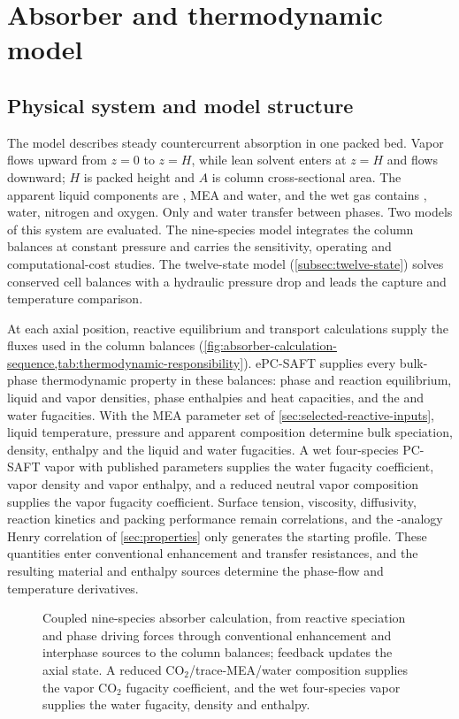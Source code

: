 \section{Absorber and thermodynamic model}\label{sec:model-framework}
\subsection{Physical system and model structure}
The model describes steady countercurrent absorption in one packed bed.
Vapor flows upward from $z=0$ to $z=H$, while lean solvent enters at $z=H$ and flows downward; $H$ is packed height and $A$ is column cross-sectional area.
The apparent liquid components are \COtwo, MEA and water, and the wet gas contains \COtwo, water, nitrogen and oxygen.
Only \COtwo{} and water transfer between phases.
Two models of this system are evaluated.
The nine-species model integrates the column balances at constant pressure and carries the sensitivity, operating and computational-cost studies.
The twelve-state model (\cref{subsec:twelve-state}) solves conserved cell balances with a hydraulic pressure drop and leads the capture and temperature comparison.

At each axial position, reactive equilibrium and transport calculations supply the fluxes used in the column balances (\cref{fig:absorber-calculation-sequence,tab:thermodynamic-responsibility}).
ePC-SAFT supplies every bulk-phase thermodynamic property in these balances: phase and reaction equilibrium, liquid and vapor densities, phase enthalpies and heat capacities, and the \COtwo{} and water fugacities.
With the MEA parameter set of \cref{sec:selected-reactive-inputs}, liquid temperature, pressure and apparent composition determine bulk speciation, density, enthalpy and the liquid \COtwo{} and water fugacities.
A wet four-species PC-SAFT vapor with published parameters supplies the water fugacity coefficient, vapor density and vapor enthalpy, and a reduced neutral vapor composition supplies the vapor \COtwo{} fugacity coefficient.
Surface tension, viscosity, diffusivity, reaction kinetics and packing performance remain correlations, and the \NtwoO{}-analogy Henry correlation of \cref{sec:properties} only generates the starting profile.
These quantities enter conventional enhancement and transfer resistances, and the resulting material and enthalpy sources determine the phase-flow and temperature derivatives.

\begin{figure}[pos=htbp]
\centering

\caption{Coupled nine-species absorber calculation, from reactive speciation and phase driving forces through conventional enhancement and interphase sources to the column balances; feedback updates the axial state. A reduced CO$_2$/trace-MEA/water composition supplies the vapor CO$_2$ fugacity coefficient, and the wet four-species vapor supplies the water fugacity, density and enthalpy.}
\label{fig:absorber-calculation-sequence}
\end{figure}

